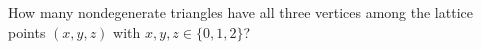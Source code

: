 How many nondegenerate triangles have all three vertices among the lattice points $(x,y,z)$ with $x,y,z\in\{0,1,2\}$?
